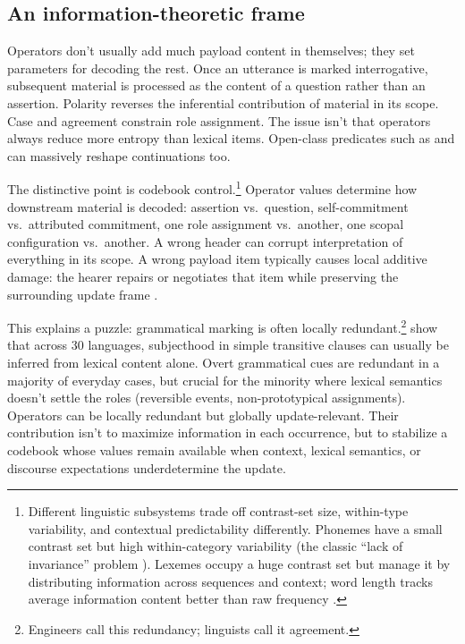 \documentclass[12pt,letterpaper]{article}
\begin{document}
\subsection{An information-theoretic frame}

Operators don't usually add much payload content in themselves; they set parameters for decoding the rest. Once an utterance is marked interrogative, subsequent material is processed as the content of a question rather than an assertion. Polarity reverses the inferential contribution of material in its scope. Case and agreement constrain role assignment. The issue isn't that operators always reduce more entropy than lexical items. Open-class predicates such as  and  can massively reshape continuations too.

The distinctive point is codebook control.\footnote{Different linguistic subsystems trade off contrast-set size, within-type variability, and contextual predictability differently. Phonemes have a small contrast set but high within-category variability (the classic \enquote{lack of invariance} problem \citep{libermanetal1967}). Lexemes occupy a huge contrast set but manage it by distributing information across sequences and context; word length tracks average information content better than raw frequency \citep{piantadositilygibson2011}.} Operator values determine how downstream material is decoded: assertion vs.\ question, self-commitment vs.\ attributed commitment, one role assignment vs.\ another, one scopal configuration vs.\ another. A wrong header can corrupt interpretation of everything in its scope. A wrong payload item typically causes local additive damage: the hearer repairs or negotiates that item while preserving the surrounding update frame \citep{shannon1948,coverthomas2006}.

{\sloppy This explains a puzzle: grammatical marking is often locally redundant.\footnote{Engineers call this redundancy; linguists call it agreement.} \textcite{mahowaldetal2023} show that across 30 languages, subjecthood in simple transitive clauses can usually be inferred from lexical content alone. Overt grammatical cues are redundant in a majority of everyday cases, but crucial for the minority where lexical semantics doesn't settle the roles (reversible events, non-prototypical assignments). Operators can be locally redundant but globally update-relevant. Their contribution isn't to maximize information in each occurrence, but to stabilize a codebook whose values remain available when context, lexical semantics, or discourse expectations underdetermine the update.\par}
\end{document}
